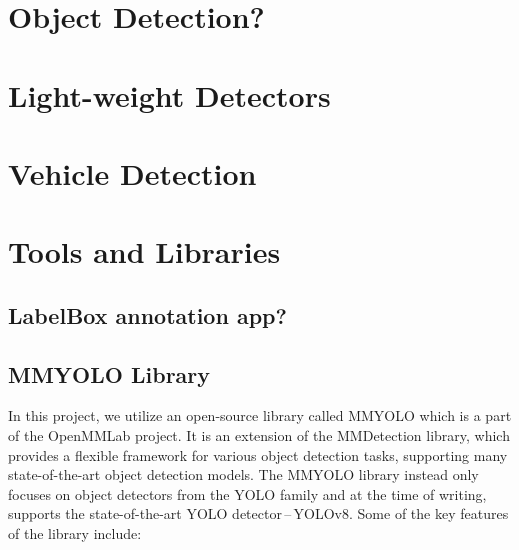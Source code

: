 \section{Object Detection?}


\section{Light-weight Detectors}


\section{Vehicle Detection}



\section{Tools and Libraries}


\subsection*{LabelBox annotation app?}


\subsection*{MMYOLO Library}

In this project, we utilize an open-source library
called MMYOLO which is a part of the
OpenMMLab project. It is an extension of the MMDetection
library, which provides a flexible framework for various object detection tasks,
supporting many state-of-the-art object detection models. The MMYOLO library
instead only focuses on object detectors from the YOLO family and at the time of
writing, supports the state-of-the-art YOLO detector\,--\,YOLOv8. Some of the
key features of the library include:

